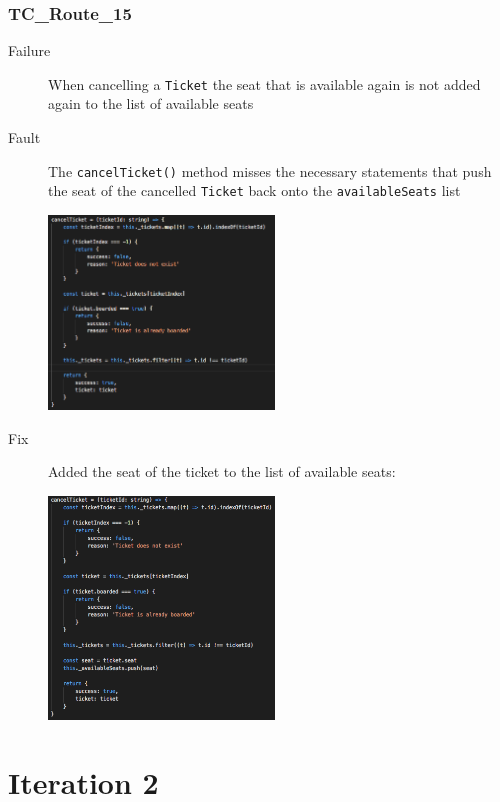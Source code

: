 \documentclass[11pt]{article}
\begin{document}
\subsubsection{TC\_Route\_15}
\label{sec:orge108b77}

\begin{description}
\item[{Failure}] When cancelling a \texttt{Ticket} the seat that is available again is not added again to the list of available seats
\item[{Fault}] The \texttt{cancelTicket()} method misses the necessary statements that push the seat of the cancelled \texttt{Ticket} back onto the \texttt{availableSeats} list
\begin{center}
\includegraphics[width=6cm]{./Iteration2.rtfd/Pasted Graphic 2.tiff.png}
\end{center}
\item[{Fix}] Added the seat of the ticket to the list of available seats:
\begin{center}
\includegraphics[width=6cm]{./Iteration2.rtfd/1_Pasted Graphic 3.tiff.png}
\end{center}
\end{description}

\section{Iteration 2}
\label{sec:org768d8d3}
\end{document}
